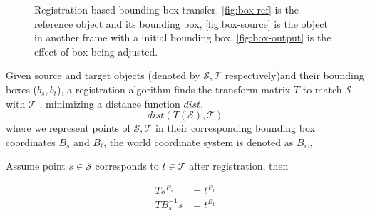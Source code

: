 \documentclass[letterpaper, 10 pt, conference]{ieeeconf}  %
\begin{document}
\begin{figure}[ht]
\begin{subfigure}[t]{0.18\linewidth}
		\caption{}\label{fig:reg-input}
	\end{subfigure}\hfill

	
	\caption{Registration based bounding box transfer. \ref{fig:box-ref} is the reference object and its bounding box, \ref{fig:box-source} is the object in another frame with a initial  bounding box, \ref{fig:box-output} is the effect of box being adjusted.}
\end{figure}


Given source and target objects (denoted by $\mathcal{S,T}$ respectively)and their bounding boxes ($b_s,b_t$), a registration algorithm finds the transform matrix $T$ to match $\mathcal{S}$ with $\mathcal{T}$ , minimizing a distance function $dist$,
$$dist(T(\mathcal{S}),\mathcal{T})$$
where we represent points of $\mathcal{S,T}$ in their corresponding bounding box coordinates $B_s$ and $B_t$, the world coordinate system is denoted as $B_w$,

Assume point $s \in \mathcal{S}$ corresponds to $t \in \mathcal{T}$ after registration, then


\begin{align}
T s^{B_s} &= t^{B_t}\\
T B_s^{-1}s &= t^{B_t} \label{eq:eq1}
\end{align}
\end{document}
